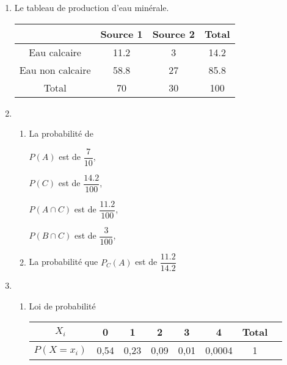 \documentclass[12pt,a4paper]{article}
\begin{document}
\begin{center}
        \shadowbox{\begin{large}
                \textcolor{black}{Exercice de maths}
        \end{large}}
    \end{center}
    \vspace{0.5 cm}
\begin{enumerate}
	\item Le tableau de production d'eau minérale. 
	\begin{table}[ht]
   		\centering
   		\begin{tabular}{|c|c|c|c|}
  			\hline
			 					& Source 1 	& Source 2 	& Total 	\\
		   \hline 
			Eau calcaire 		& 11.2 		& 3 		& 14.2		\\
			\hline
			Eau non calcaire 	& 58.8		& 27		& 85.8		\\
		   \hline
			Total 				& 70 		& 30  		& 100  		\\
		   \hline

   		\end{tabular}
	\end{table}
\item \begin{enumerate}
	\item La probabilité de\par
			$P(A)$ est de $\dfrac{7}{10}$,\par
			$P(C)$ est de $\dfrac{14.2}{100}$,\par
			$P(A\cap C)$ est de $\dfrac{11.2}{100}$,\par
			$P(B \cap C)$ est de $\dfrac{3}{100}$,\par
	\item	La probabilité que $P_C(A)$ est de $\dfrac{11.2}{14.2}$
\end{enumerate}
    \vspace{0.5 cm}
\item
	\begin{enumerate}
	\item Loi de probabilité 
		\begin{table}[ht]
        \centering
        \begin{tabular}{|c|c|c|c|c|c|c|c|}
            \hline
            $X_i$                    & 0  		& 1  	& 2		&	3	&	4	& Total     \\
           \hline
           $P(X=x_i)$ 			     &  0,54    & 0,23     &  0,09 & 	0,01	& 0,0004		&  1  \\
           \hline


\end{tabular}
\end{table}
\end{enumerate}
\end{enumerate}
\end{document}
